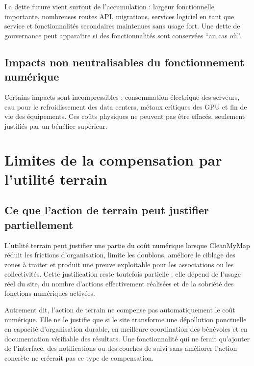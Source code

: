 \documentclass[
  10pt,
  a4paper,
  DIV=11,
  numbers=noendperiod,
  oneside]{scrreprt}
\begin{document}
La dette future vient surtout de l'accumulation : largeur fonctionnelle
importante, nombreuses routes API, migrations, services logiciel en tant
que service et fonctionnalités secondaires maintenues sans usage fort.
Une dette de gouvernance peut apparaître si des fonctionnalités sont
conservées ``au cas où''.

\subsection{Impacts non neutralisables du fonctionnement
numérique}\label{impacts-non-neutralisables-du-fonctionnement-numuxe9rique}

Certains impacts sont incompressibles : consommation électrique des
serveurs, eau pour le refroidissement des data centers, métaux critiques
des GPU et fin de vie des équipements. Ces coûts physiques ne peuvent
pas être effacés, seulement justifiés par un bénéfice supérieur.

\section{Limites de la compensation par l'utilité
terrain}\label{limites-de-la-compensation-par-lutilituxe9-terrain}

\subsection{Ce que l'action de terrain peut justifier
partiellement}\label{ce-que-laction-de-terrain-peut-justifier-partiellement}

L'utilité terrain peut justifier une partie du coût numérique lorsque
CleanMyMap réduit les frictions d'organisation, limite les doublons,
améliore le ciblage des zones à traiter et produit une preuve
exploitable pour les associations ou les collectivités. Cette
justification reste toutefois partielle : elle dépend de l'usage réel du
site, du nombre d'actions effectivement réalisées et de la sobriété des
fonctions numériques activées.

Autrement dit, l'action de terrain ne compense pas automatiquement le
coût numérique. Elle ne le justifie que si le site transforme une
dépollution ponctuelle en capacité d'organisation durable, en meilleure
coordination des bénévoles et en documentation vérifiable des résultats.
Une fonctionnalité qui ne ferait qu'ajouter de l'interface, des
notifications ou des couches de suivi sans améliorer l'action concrète
ne créerait pas ce type de compensation.
\end{document}
